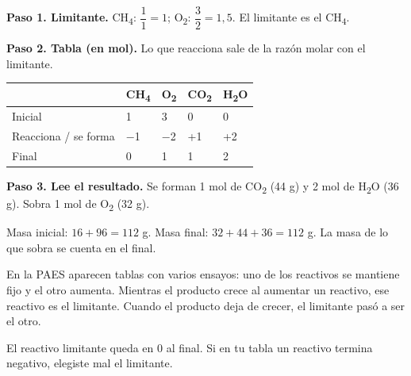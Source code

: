  

\textbf{Paso 1. Limitante.} CH\textsubscript{4}: $\dfrac{1}{1} = 1$; O\textsubscript{2}: $\dfrac{3}{2} = 1{,}5$. El limitante es el CH\textsubscript{4}.

 

\textbf{Paso 2. Tabla (en mol).} Lo que reacciona sale de la razón molar con el limitante.

 
\begin{center}\small
\begin{tabular}{@{}lllll@{}}
\toprule
 & \textbf{CH\textsubscript{4}} & \textbf{O\textsubscript{2}} & \textbf{CO\textsubscript{2}} & \textbf{H\textsubscript{2}O} \\
\midrule
Inicial & 1 & 3 & 0 & 0 \\
Reacciona / se forma & \ensuremath{-}1 & \ensuremath{-}2 & +1 & +2 \\
Final & 0 & 1 & 1 & 2 \\
\bottomrule
\end{tabular}
\end{center}
 

\textbf{Paso 3. Lee el resultado.} Se forman 1 mol de CO\textsubscript{2} (44 g) y 2 mol de H\textsubscript{2}O (36 g). Sobra 1 mol de O\textsubscript{2} (32 g).

  
\begin{clave} Masa inicial: $16 + 96 = 112$ g. Masa final: $32 + 44 + 36 = 112$ g.  La masa de lo que sobra se cuenta en el final.\end{clave}
 
\begin{clave} En la PAES aparecen tablas con varios ensayos: uno de los reactivos se mantiene fijo y el otro aumenta. Mientras el producto crece al aumentar un reactivo, ese reactivo es el limitante. Cuando el producto deja de crecer, el limitante pasó a ser el otro.\end{clave}
 
\begin{ojo}[{Ojo}] El reactivo limitante queda en 0 al final. Si en tu tabla un reactivo termina negativo, elegiste mal el limitante.\end{ojo}
